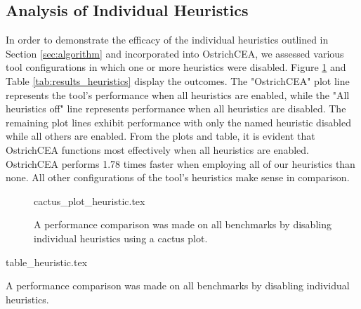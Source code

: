\subsection{Analysis of Individual Heuristics}
In order to demonstrate the efficacy of the individual heuristics outlined in Section \ref{sec:algorithm} and incorporated into OstrichCEA, we assessed various tool configurations in which one or more heuristics were disabled. Figure \ref{fig:cactus_heuristics} and Table \ref{tab:results_heuristics} display the outcomes. The "OstrichCEA" plot line represents the tool's performance when all heuristics are enabled, while the "All heuristics off" line represents performance when all heuristics are disabled. The remaining plot lines exhibit performance with only the named heuristic disabled while all others are enabled. From the plots and table, it is evident that OstrichCEA functions most effectively when all heuristics are enabled. OstrichCEA performs 1.78 times faster when employing all of our heuristics than none. All other configurations of the tool's heuristics make sense in comparison.
\begin{figure}
  {cactus_plot_heuristic.tex}
  \caption{A performance comparison was made on all benchmarks by disabling individual heuristics using a cactus plot.}
  \label{fig:cactus_heuristics}
\end{figure}
\begin{table}
  {table_heuristic.tex}
  \caption{A performance comparison was made on all benchmarks by disabling individual heuristics.}
  \label{tab:results_heuristics}
\end{table}

%